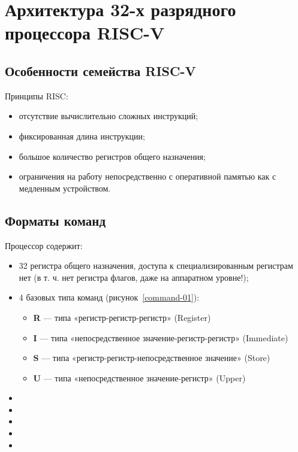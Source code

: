 \chapter{Архитектура 32-х разрядного процессора RISC-V}

\section{Особенности семейства RISC-V}

Принципы RISC:
\begin{itemize}
    \item отсутствие вычислительно сложных инструкций;
    \item фиксированная длина инструкции;
    \item большое количество регистров общего назначения;
    \item ограничения на работу непосредственно с оперативной памятью как с медленным устройством.
\end{itemize}


\section{Форматы команд}

Процессор содержит:
\begin{itemize}
    \item 32 регистра общего назначения, доступа к специализированным регистрам нет (в т. ч. нет регистра флагов, даже на аппаратном уровне!);
    \item 4 базовых типа команд (рисунок~\ref{command-01}):
    \begin{itemize}
        \item \textbf{R} --- типа «регистр-регистр-регистр» (Register)
        \item \textbf{I} --- типа «непосредственное значение-регистр-регистр» (Immediate)
        \item \textbf{S} --- типа «регистр-регистр-непосредственное значение» (Store)
        \item \textbf{U} --- типа «непосредственное значение-регистр» (Upper)
    \end{itemize}
    \item
    \item
    \item
    \item
    \item
\end{itemize}


